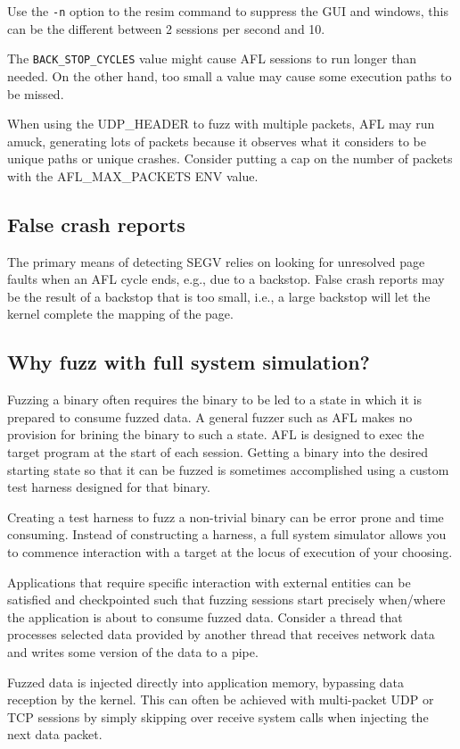 \documentclass[titlepage]{article}
\begin{document}
Use the {\tt -n} option to the resim command to suppress the GUI and windows, this can be the different between 2 sessions per second and 10.

The {\tt BACK\_STOP\_CYCLES} value might cause AFL sessions to run longer than needed.  On the other hand, too small a value may cause some
execution paths to be missed.

When using the UDP\_HEADER to fuzz with multiple packets, AFL may run amuck, generating lots of packets because it observes what it considers
to be unique paths or unique crashes.  Consider putting a cap on the number of packets with the AFL\_MAX\_PACKETS ENV value. 

\subsection{False crash reports}
The primary means of detecting SEGV relies on looking for unresolved page faults when an AFL cycle ends, e.g., due to a backstop.
False crash reports may be the result of a backstop that is too small, i.e., a large backstop will let the kernel complete the
mapping of the page.

\subsection{Why fuzz with full system simulation?}
Fuzzing a binary often requires the binary to be led to a state in which it is prepared
to consume fuzzed data. A general fuzzer such as AFL makes no provision for brining the 
binary to such a state.  AFL is designed to exec the target program at the start of each
session.  Getting a binary into the desired starting state so that it can be fuzzed is
sometimes accomplished using a custom test harness designed for that binary.

Creating a test harness to fuzz a non-trivial binary can be error prone and time consuming.
Instead of constructing a harness, a full system simulator allows you to commence interaction
with a target at the locus of execution of your choosing.

Applications that require specific interaction with external entities can be satisfied and checkpointed
such that fuzzing sessions start precisely when/where the application is about to consume fuzzed data.
Consider a thread that processes selected data provided by another thread that receives network data
and writes some version of the data to a pipe.

Fuzzed data is injected directly into application memory, bypassing data reception by the kernel.
This can often be achieved with multi-packet UDP or TCP sessions by simply skipping over receive system
calls when injecting the next data packet.
\end{document}
